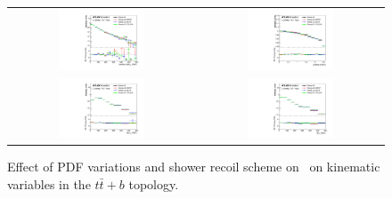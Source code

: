 \begin{figure}[p]
\begin{center}
\begin{tabular}{cc}
\includegraphics[width=0.48\textwidth]{Modeling/Figures/other_tt1bq_q1_pt_norm} &
\includegraphics[width=0.48\textwidth]{Modeling/Figures/other_tt1bq_q1_eta_norm} \\
\includegraphics[width=0.48\textwidth]{Modeling/Figures/other_tt1bq_top_pt_norm} &
\includegraphics[width=0.48\textwidth]{Modeling/Figures/other_tt1bq_ttbar_pt_norm} \\
\end{tabular}
\caption{Effect of PDF variations and shower recoil scheme  on \ShOL\ on kinematic variables in the $t\bar{t}+b$ topology.}
\label{fig:other_tt1b}
\end{center}
\end{figure}
